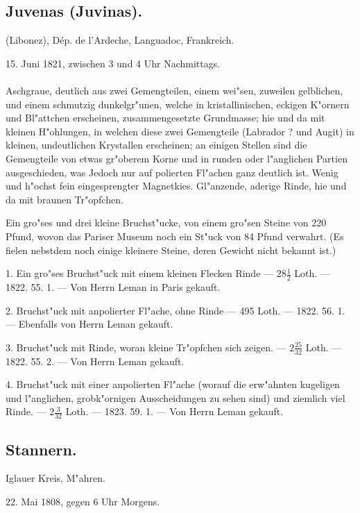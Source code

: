 \documentclass[a4paper, 11pt, oneside, polutonikogreek, german]{article}
\begin{document}
\subsection{Juvenas (Juvinas).}
\begin{center}
\small
(Libonez), Dép. de l'Ardeche, Languadoc, Frankreich.

15. Juni 1821, zwischen 3 und 4 Uhr Nachmittags.
\end{center}
\paragraph{}
Aschgraue, deutlich aus zwei Gemengteilen, einem wei"sen, zuweilen gelblichen, und einem schmutzig dunkelgr"unen, welche in kristallinischen, eckigen K"ornern und Bl"attchen erscheinen, zusammengesetzte Grundmasse; hie und da mit kleinen H"ohlungen, in welchen diese zwei Gemengteile (Labrador ? und Augit) in kleinen, undeutlichen Krystallen erscheinen; an einigen Stellen sind die Gemengteile von etwas gr"oberem Korne und in runden oder l"anglichen Partien ausgeschieden, was Jedoch nur auf polierten Fl"achen ganz deutlich ist. Wenig und h"ochst fein eingesprengter Magnetkies. Gl"anzende, aderige Rinde, hie und da mit braunen Tr"opfchen.

Ein gro"ses und drei kleine Bruchst"ucke, von einem gro"sen Steine von 220 Pfund, wovon das Pariser Museum noch ein St"uck von 84 Pfund verwahrt. (Es fielen nebstdem noch einige kleinere Steine, deren Gewicht nicht bekannt ist.)

1. Ein gro"ses Bruchst"uck mit einem kleinen Flecken Rinde --- $28\frac{1}{2}$ Loth. --- 1822. 55. 1. --- Von Herrn Leman in Paris gekauft.

2. Bruchst"uck mit anpolierter Fl"ache, ohne Rinde --- 495 Loth. --- 1822. 56. 1. --- Ebenfalls von Herrn Leman gekauft.

3. Bruchst"uck mit Rinde, woran kleine Tr"opfchen sich zeigen. --- $2\frac{25}{32}$ Loth. --- 1822. 55. 2. --- Von Herrn Leman gekauft.

4. Bruchst"uck mit einer anpolierten Fl"ache (worauf die erw"ahnten kugeligen und l"anglichen, grobk"ornigen Ausscheidungen zu sehen sind) und ziemlich viel Rinde. --- $2\frac{3}{32}$ Loth. --- 1823. 59. 1. --- Von Herrn Leman gekauft.
\subsection{Stannern.}
\begin{center}
\small
Iglauer Kreis, M"ahren.

22. Mai 1808, gegen 6 Uhr Morgens.
\end{center}
\end{document}
